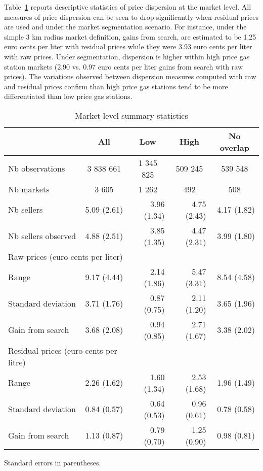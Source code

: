 \documentclass[english]{article}
\begin{document}
Table~\ref{tab:stats_des_markets} reports descriptive statistics of price dispersion at the market level. All measures of price dispersion can be seen to drop significantly when residual prices are used and under the market segmentation scenario. For instance, under the simple 3 km radius market definition, gains from search, are estimated to be 1.25 euro cents per liter with residual prices while they were 3.93 euro cents per liter with raw prices. Under segmentation, dispersion is higher within high price gas station markets (2.90 vs. 0.97 euro cents per liter gains from search with raw prices). The variations observed between dispersion measures computed with raw and residual prices confirm than high price gas stations tend to be more differentiated than low price gas stations.

\begin{table}%
\caption{Market-level summary statistics}
\label{tab:stats_des_markets}
\begin{threeparttable}
\begin{tabular}{lrrrr}
    \toprule
    \toprule
          & \multicolumn{1}{c}{All} & \multicolumn{1}{c}{Low} & \multicolumn{1}{c}{High} & \multicolumn{1}{c}{No overlap} \\
    \midrule
    Nb observations & \multicolumn{1}{c}{3 838 661} & \multicolumn{1}{c}{1 345 825} & \multicolumn{1}{c}{ 509 245} & \multicolumn{1}{c}{ 539 548} \\
    Nb markets & \multicolumn{1}{c}{ 3 605} & \multicolumn{1}{c}{ 1 262} & \multicolumn{1}{c}{  492} & \multicolumn{1}{c}{  508} \\
    \midrule
    Nb sellers & 5.09 (2.61) & 3.96 (1.34) & 4.75 (2.43) & 4.17 (1.82) \\
    Nb sellers observed & 4.88 (2.51) & 3.85 (1.35) & 4.47 (2.31) & 3.99 (1.80) \\
    \midrule
    \multicolumn{2}{l}{Raw prices (euro cents per liter)} &       &       &  \\
    Range & 9.17 (4.44) & 2.14 (1.86) & 5.47 (3.31) & 8.54 (4.58) \\
    Standard deviation & 3.71 (1.76) & 0.87 (0.75) & 2.11 (1.20) & 3.65 (1.96) \\
    Gain from search & 3.68 (2.08) & 0.94 (0.85) & 2.71 (1.67) & 3.38 (2.02) \\
    \midrule
    \multicolumn{2}{l}{Residual prices (euro cents per litre)} &       &       &  \\
    Range & 2.26 (1.62) & 1.60 (1.34) & 2.53 (1.68) & 1.96 (1.49) \\
    Standard deviation & 0.84 (0.57) & 0.64 (0.53) & 0.96 (0.61) & 0.78 (0.58) \\
    Gain from search & 1.13 (0.87) & 0.79 (0.70) & 1.25 (0.90) & 0.98 (0.81) \\
\bottomrule
\bottomrule
\end{tabular}
\begin{tablenotes}
      \small
      \item Standard errors in parentheses.
\end{tablenotes}
\end{threeparttable}
\end{table}
\end{document}
